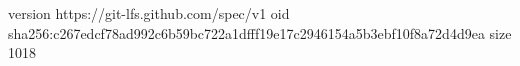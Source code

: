 version https://git-lfs.github.com/spec/v1
oid sha256:c267edcf78ad992c6b59bc722a1dfff19e17c2946154a5b3ebf10f8a72d4d9ea
size 1018
